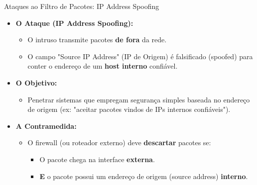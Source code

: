 \begin{frame}{Ataques ao Filtro de Pacotes: IP Address Spoofing}
    \begin{itemize}
        \item \textbf{O Ataque (IP Address Spoofing):}
              \begin{itemize}
                  \item O intruso transmite pacotes \textbf{de fora} da rede.
                  \item O campo "Source IP Address" (IP de Origem) é falsificado (spoofed) para conter o endereço de um \textbf{host interno} confiável.
              \end{itemize}

        \item \textbf{O Objetivo:}
              \begin{itemize}
                  \item Penetrar sistemas que empregam segurança simples baseada no endereço de origem (ex: "aceitar pacotes vindos de IPs internos confiáveis").
              \end{itemize}

        \item \textbf{A Contramedida:}
              \begin{itemize}
                  \item O firewall (ou roteador externo) deve \textbf{descartar} pacotes se:
                        \begin{itemize}
                            \item O pacote chega na interface \textbf{externa}.
                            \item \textbf{E} o pacote possui um endereço de origem (source address) \textbf{interno}.
                        \end{itemize}
              \end{itemize}
    \end{itemize}
\end{frame}



